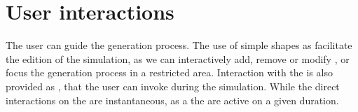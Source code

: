 



\section{User interactions}
\label{sec:env-obj-interaction}
The user can guide the generation process. The use of simple shapes as  facilitate the edition of the simulation, as we can interactively add, remove or modify , or focus the generation process in a restricted area. Interaction with the  is also provided as , that the user can invoke during the simulation. While the direct interactions on the  are instantaneous, as a the  are active on a given duration.

